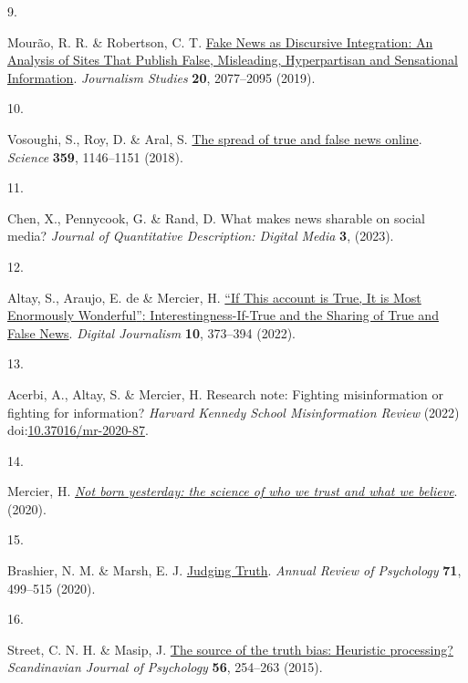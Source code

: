\documentclass[
  doc,floatsintext]{apa6}
\newlength{\cslhangindent}
\newlength{\csllabelwidth}
\newenvironment{CSLReferences}[2] %
 {\begin{list}{}{%
  \setlength{\itemindent}{0pt}
  \setlength{\leftmargin}{0pt}
  \setlength{\parsep}{0pt}
  \ifodd #1
   \setlength{\leftmargin}{\cslhangindent}
   \setlength{\itemindent}{-1\cslhangindent}
  \fi
  \setlength{\itemsep}{#2\baselineskip}}}
 {\end{list}}
\newcommand{\CSLLeftMargin}[1]{\parbox[t]{\csllabelwidth}{\strut#1\strut}}
\newcommand{\CSLRightInline}[1]{\parbox[t]{\linewidth - \csllabelwidth}{\strut#1\strut}}
\begin{document}
\begin{CSLReferences}{0}{0}
\CSLLeftMargin{9. }%
\CSLRightInline{Mourão, R. R. \& Robertson, C. T. \href{https://doi.org/10.1080/1461670X.2019.1566871}{Fake News as Discursive Integration: An Analysis of Sites That Publish False, Misleading, Hyperpartisan and Sensational Information}. \emph{Journalism Studies} \textbf{20}, 2077--2095 (2019).}

\CSLLeftMargin{10. }%
\CSLRightInline{Vosoughi, S., Roy, D. \& Aral, S. \href{https://doi.org/10.1126/science.aap9559}{The spread of true and false news online}. \emph{Science} \textbf{359}, 1146--1151 (2018).}

\CSLLeftMargin{11. }%
\CSLRightInline{Chen, X., Pennycook, G. \& Rand, D. What makes news sharable on social media? \emph{Journal of Quantitative Description: Digital Media} \textbf{3}, (2023).}

\CSLLeftMargin{12. }%
\CSLRightInline{Altay, S., Araujo, E. de \& Mercier, H. \href{https://doi.org/10.1080/21670811.2021.1941163}{{``}If This account is True, It is Most Enormously Wonderful{''}: Interestingness-If-True and the Sharing of True and False News}. \emph{Digital Journalism} \textbf{10}, 373--394 (2022).}

\CSLLeftMargin{13. }%
\CSLRightInline{Acerbi, A., Altay, S. \& Mercier, H. Research note: Fighting misinformation or fighting for information? \emph{Harvard Kennedy School Misinformation Review} (2022) doi:\href{https://doi.org/10.37016/mr-2020-87}{10.37016/mr-2020-87}.}

\CSLLeftMargin{14. }%
\CSLRightInline{Mercier, H. \emph{\href{https://doi.org/10.1515/9780691198842}{Not born yesterday: the science of who we trust and what we believe}}. (2020).}

\CSLLeftMargin{15. }%
\CSLRightInline{Brashier, N. M. \& Marsh, E. J. \href{https://doi.org/10.1146/annurev-psych-010419-050807}{Judging Truth}. \emph{Annual Review of Psychology} \textbf{71}, 499--515 (2020).}

\CSLLeftMargin{16. }%
\CSLRightInline{Street, C. N. H. \& Masip, J. \href{https://doi.org/10.1111/sjop.12204}{The source of the truth bias: Heuristic processing?} \emph{Scandinavian Journal of Psychology} \textbf{56}, 254--263 (2015).}


\end{CSLReferences}
\end{document}

